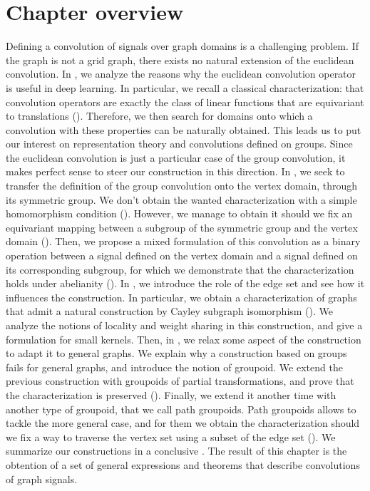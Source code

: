 \section*{Chapter overview}

Defining a convolution of signals over graph domains is a challenging problem. If the graph is not a grid graph, there exists no natural extension of the euclidean convolution. In , we analyze the reasons why the euclidean convolution operator is useful in deep learning. In particular, we recall a classical characterization: that convolution operators are exactly the class of linear functions that are equivariant to translations (). Therefore, we then search for domains onto which a convolution with these properties can be naturally obtained. This leads us to put our interest on representation theory and convolutions defined on groups. Since the euclidean convolution is just a particular case of the group convolution, it makes perfect sense to steer our construction in this direction. In , we seek to transfer the definition of the group convolution onto the vertex domain, through its symmetric group. We don't obtain the wanted characterization with a simple homomorphism condition (). However, we manage to obtain it should we fix an equivariant mapping between a subgroup of the symmetric group and the vertex domain (). Then, we propose a mixed formulation of this convolution as a binary operation between a signal defined on the vertex domain and a signal defined on its corresponding subgroup, for which we demonstrate that the characterization holds under abelianity (). In , we introduce the role of the edge set and see how it influences the construction. In particular, we obtain a characterization of graphs that admit a natural construction by Cayley subgraph isomorphism (). We analyze the notions of locality and weight sharing in this construction, and give a formulation for small kernels. Then, in , we relax some aspect of the construction to adapt it to general graphs. We explain why a construction based on groups fails for general graphs, and introduce the notion of groupoid. We extend the previous construction with groupoids of partial transformations, and prove that the characterization is preserved (). Finally, we extend it another time with another type of groupoid, that we call path groupoids. Path groupoids allows to tackle the more general case, and for them we obtain the characterization should we fix a way to traverse the vertex set using a subset of the edge set (). We summarize our constructions in a conclusive . The result of this chapter is the obtention of a set of general expressions and theorems that describe convolutions of graph signals.